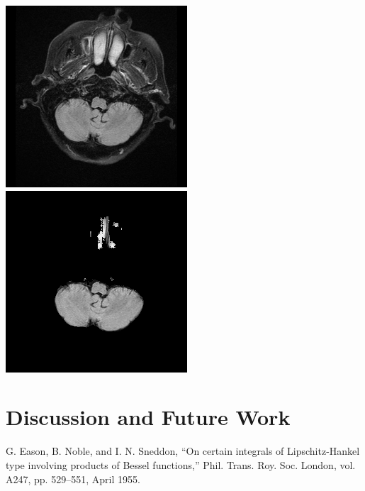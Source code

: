 \documentclass[conference]{IEEEtran}
\begin{document}
\hspace{8mm}
\includegraphics[scale = 0.3]{origin_2.png}
\hspace{22mm}
\includegraphics[scale = 0.3]{stripped_2.png}


\section{Discussion and Future Work}
\begin{thebibliography}{00}
 G. Eason, B. Noble, and I. N. Sneddon, ``On certain integrals of Lipschitz-Hankel type involving products of Bessel functions,'' Phil. Trans. Roy. Soc. London, vol. A247, pp. 529--551, April 1955.

\end{thebibliography}
\end{document}
